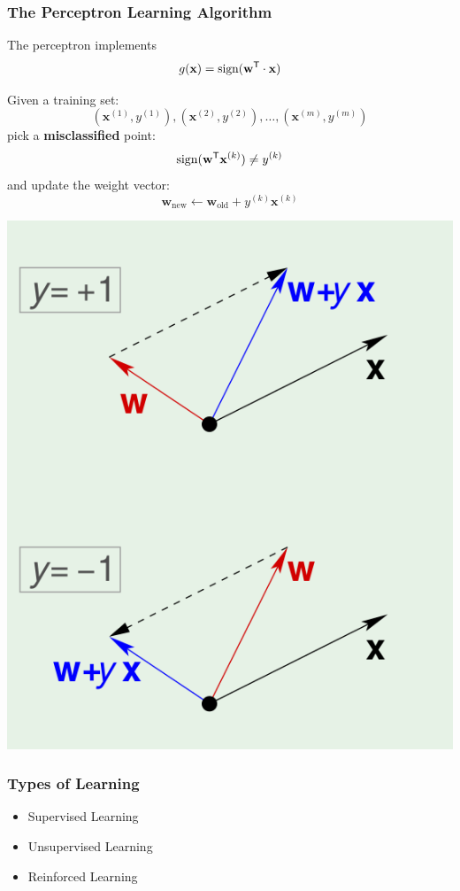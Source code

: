 \documentclass[xcolor=table]{beamer}
\newcommand{\vect}[1]{\ensuremath{\mathbf{#1}}}
\newcommand{\trans}[1]{\ensuremath{#1}^{\footnotesize{\textsf{T}}}}
\DeclareMathOperator{\sign}{sign}
\begin{document}
\begin{frame}[t]
\frametitle{The Perceptron Learning Algorithm}
The perceptron implements 
\[g(\vect{x}) = \sign(\trans{\vect{w}} \cdot \vect{x})\]

\parbox[t]{5cm}{
Given a training set: 
\[(\vect{x}^{(1)}, y^{(1)}), (\vect{x}^{(2)}, y^{(2)}), \ldots, (\vect{x}^{(m)},
y^{(m)})\]
pick a \textbf{misclassified} point:
\[
    \sign (\trans{\vect{w}} \vect{x}^{(k)}) \neq y^{(k)}
\]
and update the weight vector:
\[
    \vect{w}_{\text{new}} \leftarrow \vect{w}_{\text{old}} + y^{(k)} \vect{x}^{(k)}
\]
} 
\hfill
\parbox[t]{5cm}{
\begin{center}
    \includegraphics[scale=0.2]{PLA.png}
\end{center}
}
\end{frame}

\begin{frame}[t]
\frametitle{Types of Learning}
\begin{itemize}
    \item Supervised Learning
    \item Unsupervised Learning
    \item Reinforced Learning 
\end{itemize}
\end{frame}
\end{document}
